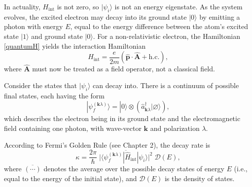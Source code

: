 \documentclass[pra,12pt]{revtex4}
\begin{document}
In actuality, $H_{\mathrm{int}}$ is not zero, so $|\psi_i\rangle$ is
not an energy eigenstate.  As the system evolves, the excited electron
may decay into its ground state $|0\rangle$ by emitting a photon with
energy $E$, equal to the energy difference between the atom's excited
state $|1\rangle$ and ground state $|0\rangle$.  For a
non-relativistic electron, the Hamiltonian \eqref{quantumH} yields the
interaction Hamiltonian
\begin{equation}
  H_{\mathrm{int}} = \frac{e}{2m} \left( \hat{\mathbf{p}} \cdot \hat{\mathbf{A}} + \mathrm{h.c.}\right),
\end{equation}
where $\hat{\mathbf{A}}$ must now be treated as a field operator, not
a classical field.

Consider the states that $|\psi_i\rangle$ can decay into.  There is a
continuum of possible final states, each having the form
\begin{equation}
  | \psi_{f}^{(\mathbf{k}\lambda)} \rangle = |0\rangle \otimes
  \left( \hat{a}_{\mathbf{k}\lambda}^\dagger |\varnothing\rangle\right),
  \label{decaystate}
\end{equation}
which describes the electron being in its ground state and the
electromagnetic field containing one photon, with wave-vector
$\mathbf{k}$ and polarization $\lambda$.

According to Fermi's Golden Rule (see Chapter 2), the decay rate is
\begin{equation}
  \kappa = \frac{2\pi}{\hbar} \;
  \overline{\Big| \langle \psi_{f}^{(\mathbf{k}\lambda)} | \hat{H}_{\mathrm{int}}|\psi_i\rangle\Big|^2} \;
  \mathcal{D}(E),
\end{equation}
where $\overline{(\cdots)}$ denotes the average over the possible
decay states of energy $E$ (i.e., equal to the energy of the initial
state), and $\mathcal{D}(E)$ is the density of states.
\end{document}
